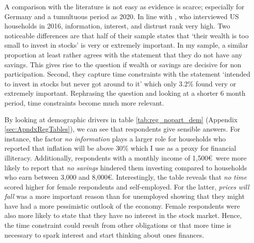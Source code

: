 \documentclass[ProjectABM]{subfiles}
\begin{document}


A comparison with the literature is not easy as evidence is scarce; especially for Germany and a tumultuous period as 2020. In line with \cite{choi_2020}, who interviewed US households in 2016, information, interest, and distrust rank very high. Two noticeable differences are that half of their sample states that `their wealth is too small to invest in stocks' is very or extremely important. In my sample, a similar proportion at least rather agrees with the statement that they do not have any savings. This gives rise to the question if wealth or savings are decisive for non participation. Second, they capture time constraints with the statement `intended to invest in stocks but never got around to it' which only 3.2\% found very or extremely important. Rephrasing the question and looking at a shorter 6 month period, time constraints become much more relevant.


By looking at demographic drivers in table \ref{tab:reg_nopart_dem} (Appendix \ref{sec:ApndxRegTables}), we can see that respondents give sensible answers. For instance, the factor \textit{no information} plays a larger role for households who reported that inflation will be above 30\% which I use as a proxy for financial illiteracy. Additionally, respondents with a monthly income of 1,500\euro\ were more likely to report that \textit{no savings} hindered them investing compared to households who earn between 3,000 and 8,000\euro. Interestingly, the table reveals that \textit{no time} scored higher for female respondents and self-employed. For the latter, \textit{prices will fall} was a more important reason than for unemployed showing that they might have had a more pessimistic outlook of the economy. Female respondents were also more likely to state that they have no interest in the stock market. Hence, the time constraint could result from other obligations or that more time is necessary to spark interest and start thinking about ones finances.


\end{document}
